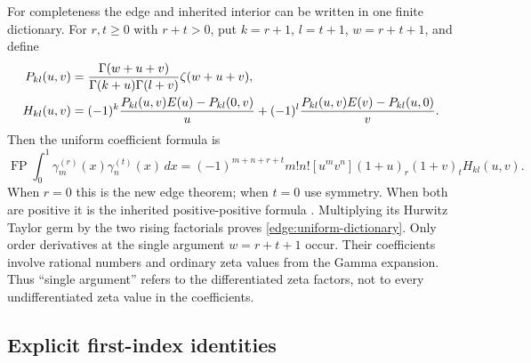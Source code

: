 For completeness the edge and inherited interior can be written in one
finite dictionary. For $r,t\ge0$ with $r+t>0$, put
$k=r+1$, $l=t+1$, $w=r+t+1$, and define
\begin{align}
 P_{kl}(u,v)&=\frac{\Gamma(w+u+v)}{\Gamma(k+u)\Gamma(l+v)}
                         \zeta(w+u+v),\notag\\
 H_{kl}(u,v)&=(-1)^k\frac{P_{kl}(u,v)E(u)-P_{kl}(0,v)}{u}
       +(-1)^l\frac{P_{kl}(u,v)E(v)-P_{kl}(u,0)}{v}.
       \label{edge:uniform-kernel}
\end{align}
Then the uniform coefficient formula is
\begin{equation}\label{edge:uniform-dictionary}
 \boxed{\displaystyle
 \operatorname{FP}\int_0^1\gamma_m^{(r)}(x)\gamma_n^{(t)}(x)\,dx
 =(-1)^{m+n+r+t}m!n![u^mv^n]
             (1+u)_r(1+v)_tH_{kl}(u,v).}
\end{equation}
When $r=0$ this is the new edge theorem; when $t=0$ use symmetry.
When both are positive it is the inherited positive-positive formula
\cite[Theorem \texttt{hprod:stieltjes-products}]{tail-polygamma}.
Multiplying its Hurwitz Taylor germ by the two rising factorials
proves \eqref{edge:uniform-dictionary}. Only order derivatives at the
single argument $w=r+t+1$ occur. Their coefficients involve rational
numbers and ordinary zeta values from the Gamma expansion. Thus
``single argument'' refers to the differentiated zeta factors, not
to every undifferentiated zeta value in the coefficients.

\subsection{Explicit first-index identities}

